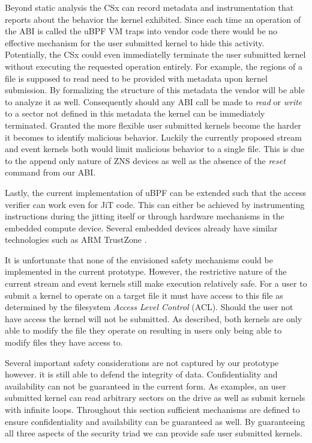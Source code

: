 Beyond static analysis the CSx can record metadata and instrumentation that
reports about the behavior the kernel exhibited. Since each time an operation of
the ABI is called the uBPF VM traps into vendor code there would be no effective
mechanism for the user submitted kernel to hide this activity. Potentially, the
CSx could even immediatelly terminate the user submitted kernel without
executing the requested operation entirely. For example, the regions of a file
is supposed to read need to be provided with metadata upon kernel submission.
By formalizing the structure of this metadata the vendor will be able to analyze
it as well. Consequently should any ABI call be made to \textit{read} or
\textit{write} to a sector not defined in this metadata the kernel can be
immediately terminated. Granted the more flexible user submitted kernels become
the harder it becomes to identify malicious behavior. Luckily the currently
proposed stream and event kernels both would limit malicious behavior to a
single file. This is due to the append only nature of ZNS devices as well as the
absence of the \textit{reset} command from our ABI.

Lastly, the current implementation of uBPF can be extended such that the access
verifier can work even for JiT code. This can either be achieved by
instrumenting instructions during the jitting itself or through hardware
mechanisms in the embedded compute device. Several embedded devices already have
similar technologies such as ARM TrustZone \cite{Pinto2019DemystifyingAT}.

It is unfortunate that none of the envisioned safety mechanisms could be
implemented in the current prototype. However, the restrictive nature of the
current stream and event kernels still make execution relatively safe. For a
user to submit a kernel to operate on a target file it must have access to this
file as determined by the filesystem \textit{Access Level Control} (ACL).
Should the user not have access the kernel will not be submitted. As described,
both kernels are only able to modify the file they operate on resulting in users
only being able to modify files they have access to.

Several important safety considerations are not captured by our prototype
however. it is still able to defend the integrity of data. Confidentiality and
availability can not be guaranteed in the current form. As examples, an user
submitted kernel can read arbitrary sectors on the drive as well as submit
kernels with infinite loops. Throughout this section sufficient mechanisms are
defined to ensure confidentiality and availability can be guaranteed as well.
By guaranteeing all three aspects of the security triad we can provide safe
user submitted kernels.

